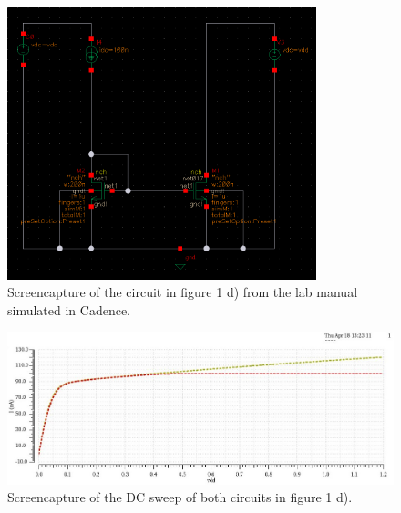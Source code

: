 \documentclass[onecolumn]{article}
\begin{document}
\begin{figure}[h!]
    \centering
    \includegraphics[width=0.8\textwidth]{circuit_d_simple.png}
    \caption{Screencapture of the circuit in figure 1 d) from the lab manual simulated in Cadence.}
    \label{fig:circuitdsimple}
\end{figure}

\begin{figure}[h!]
    \centering
    \includegraphics[width=1\textwidth]{plot_circuit_d_dc_sweep_omskjert.jpg}
    \caption{Screencapture of the DC sweep of both circuits in figure 1 d).}
    \label{fig:plotd}
\end{figure}
\end{document}
